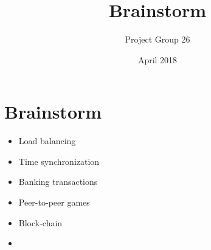\documentclass{article}
\title{Brainstorm}
\author{Project Group 26}
\date{April 2018}
\begin{document}
\maketitle

\section{Brainstorm}


\begin{itemize}
    \item Load balancing
    \item Time synchronization
    \item Banking transactions
    \item Peer-to-peer games
    \item Block-chain
    \item 
\end{itemize}
\end{document}
